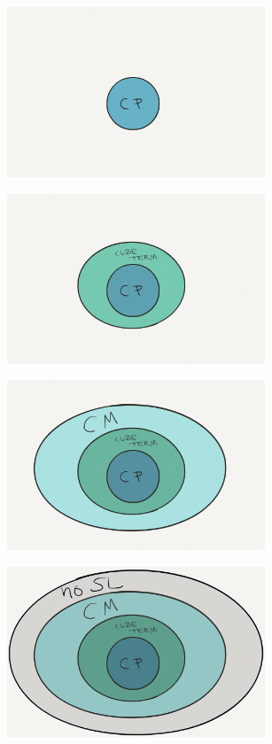 \documentclass[xcolor=dvipsnames,9pt,hide notes,mathserif]{beamer}
\begin{document}
{  \begin{overprint}
    \begin{center}\includegraphics[height=2in]{figures/CP-cropped.png}\end{center}
    \begin{center}\includegraphics[height=2in]{figures/Cube-cropped.png}\end{center}
    \begin{center}\includegraphics[height=2in]{figures/CM-cropped.png}\end{center}
    \begin{center}\includegraphics[height=2in]{figures/NoSL-cropped.png}\end{center}
  \end{overprint}
}
\end{document}
